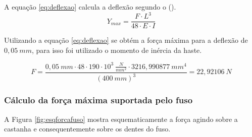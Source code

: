 A equação \ref{eq:deflexao} calcula a deflexão segundo o \citeauthor{budynas2016elementos} (\citeyear{budynas2016elementos}).
\begin{equation}\label{eq:deflexao}
    Y_{max} = \frac{F \cdot L^{3}}{48 \cdot E \cdot I}
\end{equation}

Utilizando a equação \ref{eq:deflexao} se obtém a força máxima para a deflexão de $0,05~mm$, 
para isso foi utilizado o momento de inércia da haste.

$$F = \frac{0,05~mm \cdot 48 \cdot 190 \cdot 10^{3}~\frac{N}{mm^{2}} \cdot 3216,990877~mm^{4}}{(400~mm)^{3}} = 22,92106~N$$

\subsubsection{Cálculo da força máxima suportada pelo fuso}

A Figura \ref{fig:esqforcafuso} mostra esquematicamente a força agindo sobre a castanha e consequentemente 
sobre os dentes do fuso.

